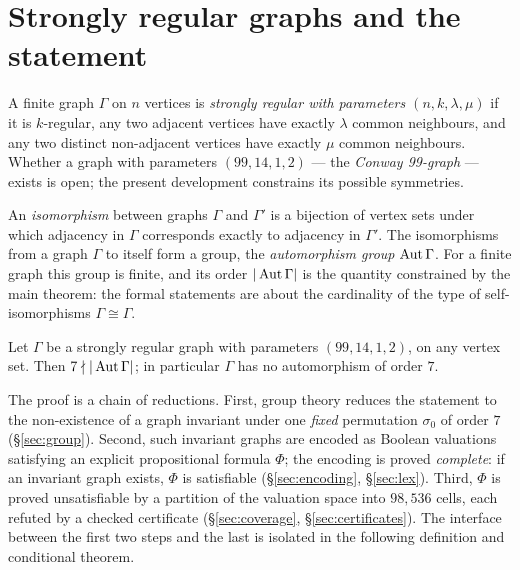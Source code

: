\chapter{Strongly regular graphs and the statement}

\begin{definition}\label{def:srg}
A finite graph $\Gamma$ on $n$ vertices is \emph{strongly regular with
parameters $(n,k,\lambda,\mu)$} if it is $k$-regular, any two adjacent
vertices have exactly $\lambda$ common neighbours, and any two distinct
non-adjacent vertices have exactly $\mu$ common neighbours.  Whether a
graph with parameters $(99,14,1,2)$ --- the \emph{Conway 99-graph} --- exists
is open; the present development constrains its possible symmetries.
\leanok
\end{definition}

\begin{definition}\label{st-aut}
An \emph{isomorphism} between graphs $\Gamma$ and $\Gamma'$ is a bijection
of vertex sets under which adjacency in $\Gamma$ corresponds exactly to
adjacency in $\Gamma'$.  The isomorphisms from a graph $\Gamma$ to itself
form a group, the \emph{automorphism group} $\operatorname{Aut}\Gamma$.  For a finite
graph this group is finite, and its order $|\operatorname{Aut}\Gamma|$ is the quantity
constrained by the main theorem: the formal statements are about the
cardinality of the type of self-isomorphisms $\Gamma \cong \Gamma$.
\leanok
\end{definition}

\begin{theorem}\label{thm:main}
Let $\Gamma$ be a strongly regular graph with parameters $(99,14,1,2)$, on any
vertex set.  Then $7 \nmid |\operatorname{Aut}\Gamma|$; in particular $\Gamma$ has no
automorphism of order $7$.
\leanok
{}
\end{theorem}

The proof is a chain of reductions.  First, group theory reduces the
statement to the non-existence of a graph invariant under one \emph{fixed}
permutation $\sigma_0$ of order $7$ (\S\ref{sec:group}).  Second, such
invariant graphs are encoded as Boolean valuations satisfying an explicit
propositional formula $\Phi$; the encoding is proved \emph{complete}: if an
invariant graph exists, $\Phi$ is satisfiable (\S\ref{sec:encoding},
\S\ref{sec:lex}).  Third, $\Phi$ is proved unsatisfiable by a partition of the
valuation space into $98{,}536$ cells, each refuted by a checked certificate
(\S\ref{sec:coverage}, \S\ref{sec:certificates}).  The interface between the
first two steps and the last is isolated in the following definition and
conditional theorem.

